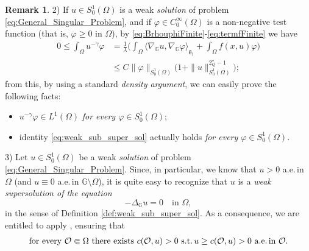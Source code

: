\documentclass[11pt]{amsart}
\numberwithin{equation}{section} %
\theoremstyle{definition}
\newtheorem{rmk}[teo]{Remark}
\begin{document}
\begin{rmk}
	2)\,\,If $u\in S^{1}_{0}(\Omega)$ is a weak \emph{solution} of
	problem
	\eqref{eq:General_Singular_Problem}, and if $\varphi\in C_0^\infty(\Omega)$ is a {non-negative}
	test function (that is, $\varphi\geq 0$ in $\Omega$), by \eqref{eq:BrhouphiFinite}-\eqref{eq:termfFinite}
	we have
	\begin{align*}
		0\leq \int_\Omega u^{-\gamma}\varphi  & = 
		\frac{1}{\lambda}\Big(\int_{\Omega}\langle \nabla_{\mathbb{G}}u, \nabla_{\mathbb{G}}\varphi \rangle_{\mathfrak{g}_{1}}
		+ \int_\Omega f(x,u)\varphi \Big)
		\\
		& \leq C\| \varphi\|_{S_0^1(\Omega)}\big(1+\| u\|_{S_0^1(\Omega)}^{2^{\star}_{Q}-1}\big);
	\end{align*}
	from this, by using a standard \emph{density argument}, we can easily prove the following facts:
	\begin{itemize}
		\item[a)] $u^{-\gamma}\varphi\in L^1(\Omega)$
		\emph{for every $\varphi\in S^{1}_{0}(\Omega)$};
		\item[b)] identity \eqref{eq:weak_sub_super_sol}
		actually holds \emph{for every $\varphi\in S^{1}_{0}(\Omega)$}.
	\end{itemize}
	
	
	3)\,\,Let $u\in S^{1}_{0}(\Omega)$ be a weak \emph{solution} of problem \eqref{eq:General_Singular_Problem}.
	Since, in particular, we know that
	$u > 0$ a.e.\,in $\Omega$ (and $u\equiv 0$ a.e.\,in $\mathbb{G}\setminus\Omega$), it is quite easy
	to recognize that $u$ is a \emph{weak supersolution of the equation}
	$$-\Delta_{\mathbb{G}} u  = 0\quad\text{in $\Omega$},$$
	in the sense of Definition \ref{def:weak_sub_super_sol}.
	As a consequence, we are entitled to apply \cite{GutLan}, ensuring that
	\begin{equation*}
		\begin{gathered}
			\text{for every $\mathcal{O}\Subset\Omega$ there exists $c(\mathcal{O},u) > 0$ 
				s.t.\,$u\geq c(\mathcal{O},u) > 0$ a.e.\,in $\mathcal{O}$}.
		\end{gathered}
	\end{equation*}
\end{rmk}



\medskip
\end{document}
